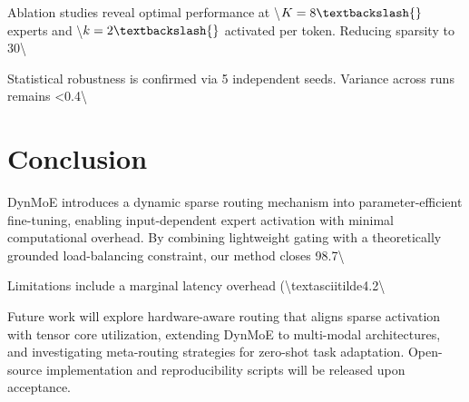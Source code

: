 \documentclass[11pt,a4paper]{article}
\begin{document}
Ablation studies reveal optimal performance at \textbackslash{}$K=8\textbackslash{}$ experts and \textbackslash{}$k=2\textbackslash{}$ activated per token. Reducing sparsity to 30\textbackslash{}%

Statistical robustness is confirmed via 5 independent seeds. Variance across runs remains <0.4\textbackslash{}%

\section{Conclusion}
DynMoE introduces a dynamic sparse routing mechanism into parameter-efficient fine-tuning, enabling input-dependent expert activation with minimal computational overhead. By combining lightweight gating with a theoretically grounded load-balancing constraint, our method closes 98.7\textbackslash{}%

Limitations include a marginal latency overhead (\textbackslash{}textasciitilde{}4.2\textbackslash{}%

Future work will explore hardware-aware routing that aligns sparse activation with tensor core utilization, extending DynMoE to multi-modal architectures, and investigating meta-routing strategies for zero-shot task adaptation. Open-source implementation and reproducibility scripts will be released upon acceptance.
\end{document}
